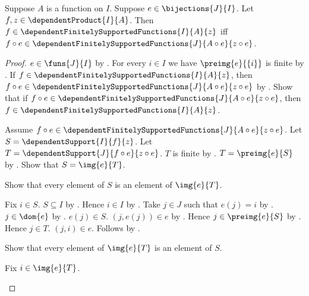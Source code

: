 \begin{theorem}\label{finite_support_bijective_reindex_iff}
    Suppose $A$ is a function on $I$.
    Suppose $e\in\bijections{J}{I}$.
    Let $f,z\in\dependentProduct{I}{A}$.
    Then
        $f\in\dependentFinitelySupportedFunctions{I}{A}{z}$ iff
        $f\circ e\in\dependentFinitelySupportedFunctions
            {J}{A\circ e}{z\circ e}$.
\end{theorem}
\begin{proof}
    $e\in\funs{J}{I}$ by .
    For every $i\in I$ we have $\preimg{e}{\{i\}}$ is finite by
        .
    If $f\in\dependentFinitelySupportedFunctions{I}{A}{z}$, then
        $f\circ e\in\dependentFinitelySupportedFunctions
            {J}{A\circ e}{z\circ e}$ by
        .
    Show that if
        $f\circ e\in\dependentFinitelySupportedFunctions
            {J}{A\circ e}{z\circ e}$,
        then $f\in\dependentFinitelySupportedFunctions{I}{A}{z}$.
    \begin{subproof}
        Assume
            $f\circ e\in\dependentFinitelySupportedFunctions
                {J}{A\circ e}{z\circ e}$.
        Let $S=\dependentSupport{I}{f}{z}$.
        Let $T=\dependentSupport{J}{f\circ e}{z\circ e}$.
        $T$ is finite by
            .
        $T=\preimg{e}{S}$ by
            .
        Show that $S=\img{e}{T}$.
        \begin{subproof}
            Show that every element of $S$ is an element of $\img{e}{T}$.
            \begin{subproof}
                Fix $i\in S$.
                $S\subseteq I$ by .
                Hence $i\in I$ by .
                Take $j\in J$ such that $e(j)=i$ by
                    .
                $j\in\dom{e}$ by
                    .
                $e(j)\in S$.
                $(j,e(j))\in e$ by
                    .
                Hence $j\in\preimg{e}{S}$ by .
                Hence $j\in T$.
                $(j,i)\in e$.
                Follows by .
            \end{subproof}
            Show that every element of $\img{e}{T}$ is an element of $S$.
            \begin{subproof}
                Fix $i\in\img{e}{T}$.

\end{subproof}
\end{subproof}
\end{subproof}
\end{proof}
